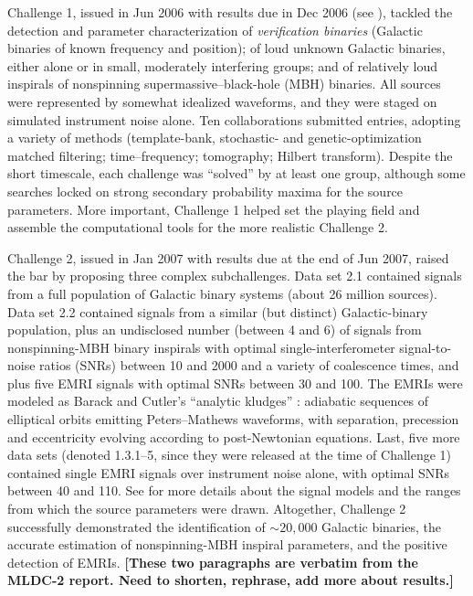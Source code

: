 \documentclass{iopart}
\begin{document}
Challenge 1, issued in Jun 2006 with results due in Dec 2006 (see \cite{mldclisasymp,mldcgwdaw1}), tackled the detection and parameter characterization of \emph{verification binaries} (Galactic binaries of known frequency and position); of loud unknown Galactic binaries, either alone or in small, moderately interfering groups; and of relatively loud inspirals of nonspinning supermassive--black-hole (MBH) binaries. All sources were represented by somewhat idealized waveforms, and they were staged on simulated instrument noise alone. Ten collaborations submitted entries, adopting a variety of methods (template-bank, stochastic- and genetic-optimization matched filtering; time--frequency; tomography; Hilbert transform). Despite the short timescale, each challenge was ``solved'' by at least one group, although some searches locked on strong secondary probability maxima for the source parameters. More important, Challenge 1 helped set the playing field and assemble the computational tools for the more realistic Challenge 2.

Challenge 2, issued in Jan 2007 with results due at the end of Jun 2007, raised the bar by proposing three complex subchallenges. Data set 2.1 contained signals from a full population of Galactic binary systems (about 26 million sources). Data set 2.2 contained signals from a similar (but distinct) Galactic-binary population, plus an undisclosed number (between 4 and 6) of signals from nonspinning-MBH binary inspirals with optimal single-interferometer signal-to-noise ratios (SNRs) between 10 and 2000 and a variety of coalescence times, and plus five EMRI signals with optimal SNRs between 30 and 100. The EMRIs were modeled as Barack and Cutler's ``analytic kludges'' \cite{barackcutler}: adiabatic sequences of elliptical orbits emitting Peters--Mathews waveforms, with separation, precession and eccentricity evolving according to post-Newtonian equations. Last, five more data sets (denoted 1.3.1--5, since they were released at the time of Challenge 1) contained single EMRI signals over instrument noise alone, with optimal SNRs between 40 and 110. See \cite{mldcgwdaw2} for more details about the signal models and the ranges from which the source parameters were drawn.
Altogether, Challenge 2 successfully demonstrated the identification of $\sim 20,000$ Galactic binaries, the accurate estimation of nonspinning-MBH inspiral parameters, and the positive detection of EMRIs.
\textbf{[These two paragraphs are verbatim from the MLDC-2 report. Need to shorten, rephrase, add more about results.]}
\end{document}
